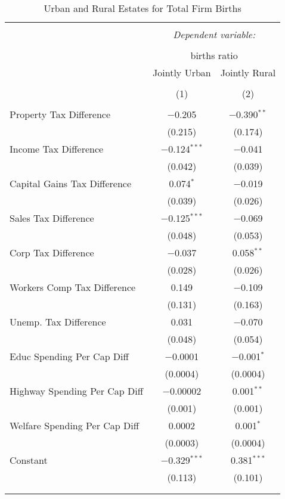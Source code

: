 
\begin{table}[!htbp] \centering 
  \caption{Urban and Rural Estates for  Total Firm Births} 
  \label{} 
\begin{tabular}{@{\extracolsep{5pt}}lcc} 
\\[-1.8ex]\hline 
\hline \\[-1.8ex] 
 & \multicolumn{2}{c}{\textit{Dependent variable:}} \\ 
\cline{2-3} 
\\[-1.8ex] & \multicolumn{2}{c}{births ratio} \\ 
 & Jointly Urban & Jointly Rural \\ 
\\[-1.8ex] & (1) & (2)\\ 
\hline \\[-1.8ex] 
 Property Tax Difference & $-$0.205 & $-$0.390$^{**}$ \\ 
  & (0.215) & (0.174) \\ 
  Income Tax Difference & $-$0.124$^{***}$ & $-$0.041 \\ 
  & (0.042) & (0.039) \\ 
  Capital Gains Tax Difference & 0.074$^{*}$ & $-$0.019 \\ 
  & (0.039) & (0.026) \\ 
  Sales Tax Difference & $-$0.125$^{***}$ & $-$0.069 \\ 
  & (0.048) & (0.053) \\ 
  Corp Tax Difference & $-$0.037 & 0.058$^{**}$ \\ 
  & (0.028) & (0.026) \\ 
  Workers Comp Tax Difference & 0.149 & $-$0.109 \\ 
  & (0.131) & (0.163) \\ 
  Unemp. Tax Difference & 0.031 & $-$0.070 \\ 
  & (0.048) & (0.054) \\ 
  Educ Spending Per Cap Diff & $-$0.0001 & $-$0.001$^{*}$ \\ 
  & (0.0004) & (0.0004) \\ 
  Highway Spending Per Cap Diff & $-$0.00002 & 0.001$^{**}$ \\ 
  & (0.001) & (0.001) \\ 
  Welfare Spending Per Cap Diff & 0.0002 & 0.001$^{*}$ \\ 
  & (0.0003) & (0.0004) \\ 
  Constant & $-$0.329$^{***}$ & 0.381$^{***}$ \\ 
  & (0.113) & (0.101) \\ 
 \hline \\[-1.8ex] 
\hline 
\hline \\[-1.8ex] 
\end{tabular} 
\end{table} 
